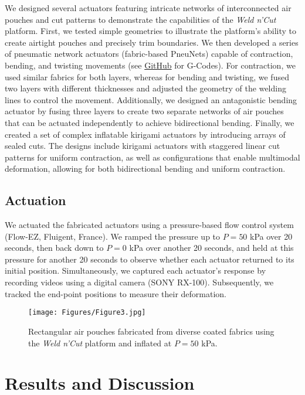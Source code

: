\documentclass[journal, letterpaper]{IEEEtran}
\begin{document}
We designed several actuators featuring intricate networks of interconnected air pouches and cut patterns to demonstrate the capabilities of the \textit{Weld n'Cut} platform.
First, we tested simple geometries to illustrate the platform’s ability to create airtight pouches and precisely trim boundaries. We then developed a series of pneumatic network actuators (fabric-based PneuNets) capable of contraction, bending, and twisting movements (see \href{https://github.com/SDUSoftRobotics/Weldn-cut}{GitHub} for G-Codes). For contraction, we used similar fabrics for both layers, whereas for bending and twisting, we fused two layers with different thicknesses and adjusted the geometry of the welding lines to control the movement.
Additionally, we designed an antagonistic bending actuator by fusing three layers to create two separate networks of air pouches that can be actuated independently to achieve bidirectional bending.
Finally, we created a set of complex inflatable kirigami actuators by introducing arrays of sealed cuts. The designs include kirigami actuators with staggered linear cut patterns for uniform contraction, as well as configurations that enable multimodal deformation, allowing for both bidirectional bending and uniform contraction.

\subsection{Actuation}
We actuated the fabricated actuators using a pressure-based flow control system (Flow-EZ, Fluigent, France). We ramped the pressure up to $P=50$ kPa over 20 seconds, then back down to $P=0$ kPa over another 20 seconds, and held at this pressure for another 20 seconds to observe whether each actuator returned to its initial position. Simultaneously, we captured each actuator's response by recording videos using a digital camera (SONY RX-100). Subsequently, we tracked the end-point positions to measure their deformation.

\begin{figure}[t]
\centering
\texttt{[image: Figures/Figure3.jpg]}
\caption{Rectangular air pouches fabricated from diverse coated fabrics using the \textit{Weld n'Cut} platform and inflated at $P=50$ kPa. }
\label{Fig3}
\end{figure}


\section{Results and Discussion}
\end{document}
